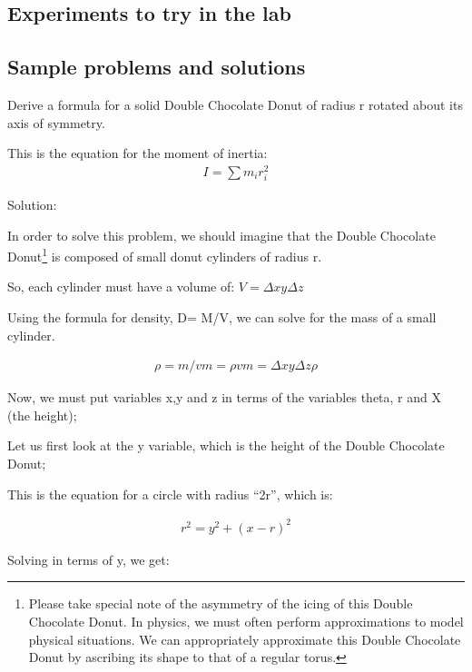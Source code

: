 \subsection{Experiments to try in the lab}

\subsection{Sample problems and solutions}
 \vspace{0.25cm}
\begin{problem}{Derive a formula for a solid Double Chocolate Donut of radius r rotated about its axis of symmetry.}



This is the equation for the moment of inertia:
\begin{align*}
I=\sum m_ir_i^{2}
\end{align*}

Solution:

In order to solve this problem, we should imagine that the Double Chocolate Donut\footnote{Please take special note of the asymmetry of the icing of this Double Chocolate Donut. In physics, we must often perform approximations to model physical situations. We can appropriately approximate this Double Chocolate Donut by ascribing its shape to that of a regular torus.} is composed of small donut cylinders of radius r.

So, each cylinder must have a volume of: $V=\Delta xy\Delta z$

Using the formula for density, D= M/V, we can solve for the mass of a small cylinder.

\begin{align*}
\rho=m/v
m=\rho v
m=\Delta xy\Delta z\rho
\end{align*}

Now, we must put variables x,y and z in terms of the variables theta, r and X (the height);

Let us first look at the y variable, which is the height of the Double Chocolate Donut;

This is the equation for a circle with radius ``2r'', which is:

\begin{align*}
r^{2}=y^{2}+(x-r)^{2}
\end{align*}

Solving in terms of y, we get:


\end{problem}
